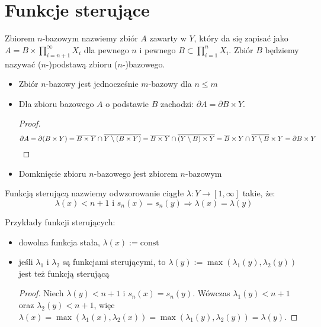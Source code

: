\section{Funkcje sterujące}


\begin{df}
Zbiorem $n$-bazowym nazwiemy zbiór $A$ zawarty w $Y$, który da się zapisać jako $A = B \times \prod_{i=n+1}^\infty X_i$ dla pewnego $n$ i pewnego $B \subset \prod_{i=1}^n X_i$. Zbiór $B$ będziemy nazywać ($n$-)podstawą zbioru ($n$-)bazowego.
\end{df}


\begin{note} \mbox{} %
\begin{itemize}
  \item Zbiór $n$-bazowy jest jednocześnie $m$-bazowy dla $n \leq m$
  \item Dla zbioru bazowego $A$ o podstawie $B$ zachodzi: $\partial A = \partial B \times Y$.
  \begin{proof}
    $$\partial A = \partial(B \times Y) = \overline{B \times Y} \cap \overline{Y \setminus (B \times Y)} = \overline{B \times Y} \cap \overline{(Y \setminus B) \times Y} = \overline{B} \times Y \cap \overline{Y \setminus B} \times Y = \partial{B} \times Y$$
  \end{proof}
  \item Domknięcie zbioru $n$-bazowego jest zbiorem $n$-bazowym
\end{itemize}
\end{note}


\begin{df}
Funkcją sterującą nazwiemy odwzorowanie ciągłe $\lambda: Y \rightarrow [1,\infty]$ takie, że:
$$\lambda(x) < n+1 \mbox{ i } s_n(x) = s_n(y) \Rightarrow \lambda(x) = \lambda(y)$$
\end{df}

\begin{note}
Przykłady funkcji sterujących:
  \begin{itemize}
    \item dowolna funkcja stała, $\lambda(x) := \mbox{const}$
    \item jeśli $\lambda_1$ i $\lambda_2$ są funkcjami sterującymi, to $\lambda(y) := \max(\lambda_1(y), \lambda_2(y))$ jest też funkcją sterującą
  \begin{proof}
    Niech $\lambda(y) < n+1$ i $s_n(x) = s_n(y)$. Wówczas $\lambda_1(y) < n+1$ oraz $\lambda_2(y) < n+1$, więc $\lambda(x) = \max(\lambda_1(x), \lambda_2(x)) = \max(\lambda_1(y), \lambda_2(y)) = \lambda(y)$.
  \end{proof}
  \end{itemize}
\end{note}


